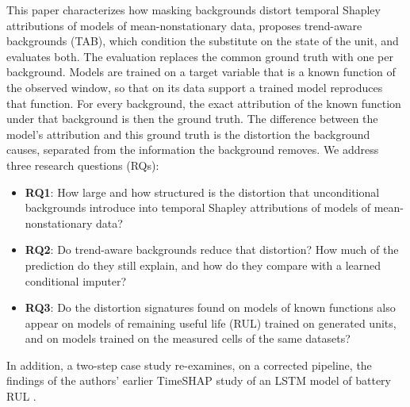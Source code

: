 \documentclass{article}
\begin{document}
This paper characterizes how masking backgrounds distort temporal Shapley attributions of models of mean-nonstationary data, proposes trend-aware backgrounds (TAB), which condition the substitute on the state of the unit, and evaluates both. The evaluation replaces the common ground truth with one per background. Models are trained on a target variable that is a known function of the observed window, so that on its data support a trained model reproduces that function. For every background, the exact attribution of the known function under that background is then the ground truth. The difference between the model's attribution and this ground truth is the distortion the background causes, separated from the information the background removes. We address three research questions (RQs):
\begin{itemize}
    \item \textbf{RQ1}: How large and how structured is the distortion that unconditional backgrounds introduce into temporal Shapley attributions of models of mean-nonstationary data?
    \item \textbf{RQ2}: Do trend-aware backgrounds reduce that distortion? How much of the prediction do they still explain, and how do they compare with a learned conditional imputer?
    \item \textbf{RQ3}: Do the distortion signatures found on models of known functions also appear on models of remaining useful life (RUL) trained on generated units, and on models trained on the measured cells of the same datasets?
\end{itemize}
In addition, a two-step case study re-examines, on a corrected pipeline, the findings of the authors' earlier TimeSHAP study of an LSTM model of battery RUL \citep{mishchuk2026explaining}.
\end{document}
